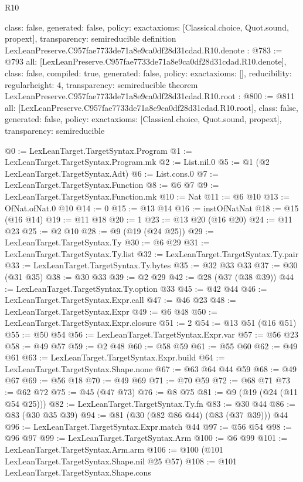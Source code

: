 \begin{lexlean}{R10}
\begin{coremodule}
{  class: false,
  generated: false,
  policy: exact{axioms: [Classical.choice, Quot.sound, propext]},
  transparency: semireducible
}
definition LexLeanPreserve.C957fae7733de71a8e9ca0df28d31cdad.R10.denote : @783 := @793 {
  all: [LexLeanPreserve.C957fae7733de71a8e9ca0df28d31cdad.R10.denote],
  class: false,
  compiled: true,
  generated: false,
  policy: exact{axioms: []},
  reducibility: regular{height: 4},
  transparency: semireducible
}
theorem LexLeanPreserve.C957fae7733de71a8e9ca0df28d31cdad.R10.root : @800 := @811 {
  all: [LexLeanPreserve.C957fae7733de71a8e9ca0df28d31cdad.R10.root],
  class: false,
  generated: false,
  policy: exact{axioms: [Classical.choice, Quot.sound, propext]},
  transparency: semireducible
}

@0 := LexLeanTarget.TargetSyntax.Program
@1 := LexLeanTarget.TargetSyntax.Program.mk
@2 := List.nil.{0}
@5 := @1 (@2 LexLeanTarget.TargetSyntax.Adt)
@6 := List.cons.{0}
@7 := LexLeanTarget.TargetSyntax.Function
@8 := @6 @7
@9 := LexLeanTarget.TargetSyntax.Function.mk
@10 := Nat
@11 := @6 @10
@13 := OfNat.ofNat.{0} @10
@14 := 0
@15 := @13 @14
@16 := instOfNatNat
@18 := @15 (@16 @14)
@19 := @11 @18
@20 := 1
@23 := @13 @20 (@16 @20)
@24 := @11 @23
@25 := @2 @10
@28 := @9 (@19 (@24 @25))
@29 := LexLeanTarget.TargetSyntax.Ty
@30 := @6 @29
@31 := LexLeanTarget.TargetSyntax.Ty.list
@32 := LexLeanTarget.TargetSyntax.Ty.pair
@33 := LexLeanTarget.TargetSyntax.Ty.bytes
@35 := @32 @33 @33
@37 := @30 (@31 @35)
@38 := @30 @33
@39 := @2 @29
@42 := @28 (@37 (@38 @39))
@44 := LexLeanTarget.TargetSyntax.Ty.option @33
@45 := @42 @44
@46 := LexLeanTarget.TargetSyntax.Expr.call
@47 := @46 @23
@48 := LexLeanTarget.TargetSyntax.Expr
@49 := @6 @48
@50 := LexLeanTarget.TargetSyntax.Expr.closure
@51 := 2
@54 := @13 @51 (@16 @51)
@55 := @50 @54
@56 := LexLeanTarget.TargetSyntax.Expr.var
@57 := @56 @23
@58 := @49 @57
@59 := @2 @48
@60 := @58 @59
@61 := @55 @60
@62 := @49 @61
@63 := LexLeanTarget.TargetSyntax.Expr.build
@64 := LexLeanTarget.TargetSyntax.Shape.none
@67 := @63 @64 @44 @59
@68 := @49 @67
@69 := @56 @18
@70 := @49 @69
@71 := @70 @59
@72 := @68 @71
@73 := @62 @72
@75 := @45 (@47 @73)
@76 := @8 @75
@81 := @9 (@19 (@24 (@11 @54 @25)))
@82 := LexLeanTarget.TargetSyntax.Ty.fn
@83 := @30 @44
@86 := @83 (@30 @35 @39)
@94 := @81 (@30 (@82 @86 @44) (@83 (@37 @39))) @44
@96 := LexLeanTarget.TargetSyntax.Expr.match @44
@97 := @56 @54
@98 := @96 @97
@99 := LexLeanTarget.TargetSyntax.Arm
@100 := @6 @99
@101 := LexLeanTarget.TargetSyntax.Arm.arm
@106 := @100 (@101 LexLeanTarget.TargetSyntax.Shape.nil @25 @57)
@108 := @101 LexLeanTarget.TargetSyntax.Shape.cons

\end{coremodule}
\end{lexlean}
